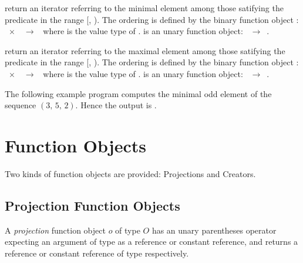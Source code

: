 {return an iterator referring to the minimal element among those satifying the
  predicate  in the range [, ). The ordering is
  defined by the binary function object :
  ~$\times$~~$\to$~ where  is the value type
  of .  is an unary function object:
  ~$\to$~.}

{return an iterator referring to the maximal element among those satifying the
  predicate  in the range [, ). The ordering is
  defined by the binary function object :
  ~$\times$~~$\to$~ where  is the value type
  of .  is an unary function object:
  ~$\to$~.}

\ccExample The following example program computes the minimal odd element of
the sequence $(3,\,5,\,2)$. Hence the output is .


  \def\ccLongParamLayout{\ccTrue}

\newpage
\section{Function Objects}

Two kinds of function objects are provided: Projections and Creators.

\subsection{Projection Function Objects}
\label{sectionProjectionFunctionObjects}

\ccDefinition 

A {\em projection\/} function object $o$ of type $O$ has an unary parentheses
operator expecting an argument of type  as a
reference or constant reference, and returns a reference or constant
reference of type  respectively.

